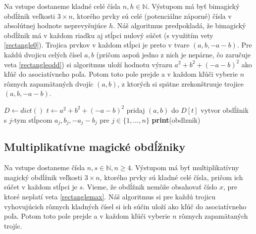 \begin{alg}
\label{algrectangle0}
Na vstupe dostaneme kladné celé čísla $n,h \in \mathbb{N}$. Výstupom má byť bimagický obdĺžnik veľkosti $3 \times n$, ktorého prvky sú celé (potenciálne záporné) čísla v absolútnej hodnote neprevyšujúce $h$. Náš algoritmus predpokladá, že bimagický obdĺžnik má v každom riadku aj stĺpci nulový súčet (s využitím vety \ref{rectangle0}). Trojica prvkov v každom stĺpci je preto v tvare $(a, b, -a-b)$. Pre každú dvojicu celých čísel $a,b$ (pričom aspoň jedno z nich je nepárne, čo zaručuje veta \ref{rectangleodd}) si algoritmus uloží hodnotu výrazu $a^2 + b^2 + (-a-b)^2$ ako kľúč do asociatívneho poľa. Potom toto pole prejde a v každom kľúči vyberie $n$ rôznych zapamätaných dvojíc $(a,b)$, z ktorých si spätne zrekonštruuje trojice $(a,b,-a-b)$.
\end{alg}

\begin{algorithmic}
\STATE $D \gets dict()$
		\STATE $t \gets a^2 + b^2 + (-a-b)^2$
		\STATE pridaj $(a,b)$ do $D[t]$
	\ENDFOR
\ENDFOR
{}
				\STATE vytvor obdĺžnik s $j$-tym stĺpcom $a_j, b_j, - a_j - b_j$ pre $j \in \{1, \dots , n\}$
					\STATE \textbf{print}(obdlznik)
				\ENDIF
			\ENDFOR
		\ENDIF
	\ENDFOR
\ENDFOR
\end{algorithmic}


\subsection{Multiplikatívne magické obdĺžniky}

\begin{alg}
\label{algrectangles}
Na vstupe dostaneme čísla $n,s \in \mathbb{N}, n \geq 4$. Výstupom má byť multiplikatívny magický obdĺžnik veľkosti $3 \times n$, ktorého prvky sú kladné celé čísla, pričom ich súčet v každom stĺpci je $s$. Vieme, že obdĺžnik nemôže obsahovať číslo $x$, pre ktoré neplatí veta \ref{rectanglemax}. Náš algoritmus si pre každú trojicu vyhovujúcich rôznych kladných čísel si ich súčin uloží ako kľúč do asociatívneho poľa. Potom toto pole prejde a v každom kľúči vyberie $n$ rôznych zapamätaných trojíc.
\end{alg}

